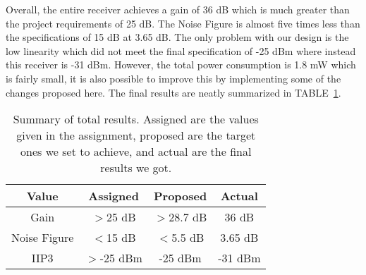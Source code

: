 Overall, the entire receiver achieves a gain of 36 dB which is much greater than the project requirements of 25 dB. The Noise Figure is almost five times less than the specifications of 15 dB  at 3.65 dB. The only problem with our design is the low linearity which did not meet the final specification of -25 dBm where instead this receiver is -31 dBm. However, the total power consumption is 1.8 mW which is fairly small, it is also possible to improve this by implementing some of the changes proposed here. The final results are neatly summarized in TABLE~\ref{tab:totalresults}.


\begin{table}[h]
\begin{center}
	\begin{tabular}{ c | c | c | c  }
		Value & Assigned & Proposed & Actual \\ \hline
		Gain & $>$25 dB & $>$28.7 dB & 36 dB \\ \hline
		Noise Figure & $<$15 dB & $<$5.5 dB & 3.65 dB \\ \hline
		IIP3 & $>$-25 dBm & -25 dBm & -31 dBm \\ 
	\end{tabular}

\end{center}
\caption{Summary of total results. Assigned are the values given in the assignment, proposed are the target ones we set to achieve, and actual are the final results we got.}
\label{tab:totalresults}
\end{table}
